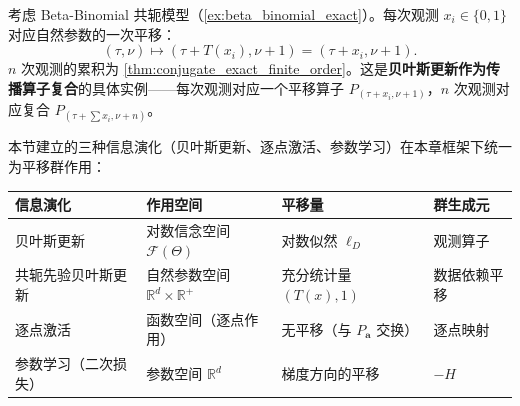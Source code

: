 \begin{example}[共轭先验的序贯更新与传播算子的复合]\label{ex:sequential_bayesian_propagation}
考虑 Beta-Binomial 共轭模型（\cref{ex:beta_binomial_exact}）。每次观测 $x_i\in\{0,1\}$ 对应自然参数的一次平移：
\[
(\tau,\nu)\mapsto(\tau + T(x_i),\nu+1) = (\tau+x_i,\nu+1).
\]
$n$ 次观测的累积为 \cref{thm:conjugate_exact_finite_order}。这是\textbf{贝叶斯更新作为传播算子复合}的具体实例——每次观测对应一个平移算子 $P_{(\tau+x_i,\nu+1)}$，$n$ 次观测对应复合 $P_{(\tau+\sum x_i,\nu+n)}$。
\end{example}

\begin{remark}[三种信息演化的统一表]\label{rem:three_info_evolutions}
本节建立的三种信息演化（贝叶斯更新、逐点激活、参数学习）在本章框架下统一为平移群作用：
\begin{center}
\small
\renewcommand{\arraystretch}{1.3}
\setlength{\tabcolsep}{4pt}
\begin{tabular}{@{}>{\raggedright\arraybackslash}p{2.2cm} >{\raggedright\arraybackslash}p{3.6cm} >{\raggedright\arraybackslash}p{3.6cm} >{\raggedright\arraybackslash}p{2.2cm}@{}}
\toprule
\textbf{信息演化} & \textbf{作用空间} & \textbf{平移量} & \textbf{群生成元} \\
\midrule
贝叶斯更新 & 对数信念空间 $\mathcal{F}(\Theta)$ & 对数似然 $\ell_D$ & 观测算子 \\
共轭先验贝叶斯更新 & 自然参数空间 $\mathbb{R}^d\times\mathbb{R}^+$ & 充分统计量 $(T(x),1)$ & 数据依赖平移 \\
逐点激活 & 函数空间（逐点作用） & 无平移（与 $P_{\mathbf{a}}$ 交换） & 逐点映射 \\
参数学习（二次损失） & 参数空间 $\mathbb{R}^d$ & 梯度方向的平移 & $-H$ \\
\bottomrule
\end{tabular}
\end{center}
\end{remark}

